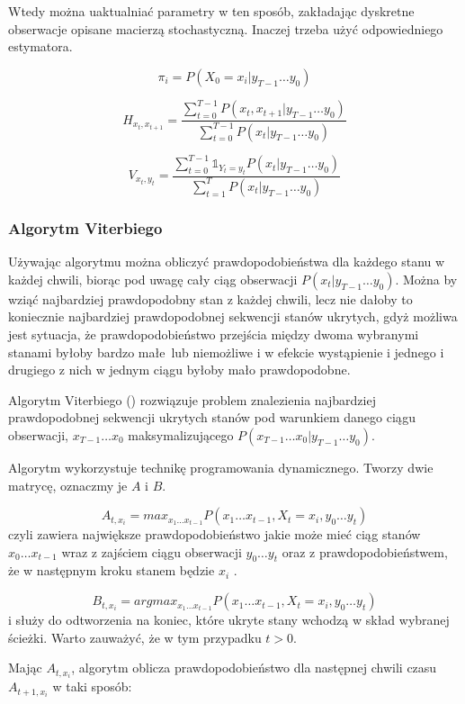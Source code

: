 Wtedy można uaktualniać parametry w ten sposób, zakładając dyskretne obserwacje opisane macierzą stochastyczną. Inaczej trzeba użyć odpowiedniego estymatora.

$$\pi_i = P(X_0 = x_i | y_{T-1} \dots y_0)$$

$$H_{x_t, x_{t+1}} = \frac{\sum_{t=0}^{T-1} P(x_t, x_{t+1} | y_{T-1} \dots y_0)}{\sum_{t=0}^{T-1} P(x_t | y_{T-1} \dots y_0)}$$

$$V_{x_t, y_t} = \frac{\sum_{t=0}^{T-1} \mathbb{1}_{Y_t = y_t} P(x_t | y_{T-1} \dots y_0)}{\sum_{t=1}^T P(x_t | y_{T-1} \dots y_0)}$$

\subsubsection{Algorytm Viterbiego}

Używając algorytmu  można obliczyć prawdopodobieństwa dla każdego stanu w każdej chwili, biorąc
pod uwagę cały ciąg obserwacji $P(x_t | y_{T-1} \dots y_0)$. Można by wziąć najbardziej prawdopodobny stan z każdej chwili,
lecz nie dałoby to koniecznie najbardziej prawdopodobnej sekwencji stanów ukrytych, gdyż możliwa jest sytuacja, że
prawdopodobieństwo przejścia między dwoma wybranymi stanami byłoby bardzo małe lub niemożliwe i w efekcie wystąpienie
i jednego i drugiego z nich w jednym ciągu byłoby mało prawdopodobne.

Algorytm Viterbiego () rozwiązuje problem znalezienia najbardziej prawdopodobnej sekwencji ukrytych stanów pod warunkiem danego ciągu obserwacji, $x_{T-1} \dots x_0$ maksymalizującego $P(x_{T-1} \dots x_0 | y_{T-1} \dots y_0)$.

Algorytm wykorzystuje technikę programowania dynamicznego. Tworzy dwie matrycę, oznaczmy je $A$ i $B$.

$$A_{t,x_i} = max_{x_1 \dots x_{t-1}} P(x_1 \dots x_{t-1}, X_t = x_i, y_0 \dots y_t)$$
czyli zawiera największe prawdopodobieństwo jakie może mieć ciąg stanów $x_0 \dots x_{t-1}$ wraz z zajściem ciągu obserwacji $y_0 \dots y_t$ oraz z prawdopodobieństwem, że w następnym kroku stanem będzie $x_i$ .

$$B_{t,x_i} = argmax_{x_1 \dots x_{t-1}} P(x_1 \dots x_{t-1}, X_t = x_i, y_0 \dots y_t)$$ i służy do odtworzenia na koniec, które ukryte stany wchodzą w skład wybranej ścieżki. Warto zauważyć, że w tym przypadku $t > 0$.

Mając $A_{t,x_i}$, algorytm oblicza prawdopodobieństwo dla następnej chwili czasu $A_{t+1,x_i}$ w taki sposób:

